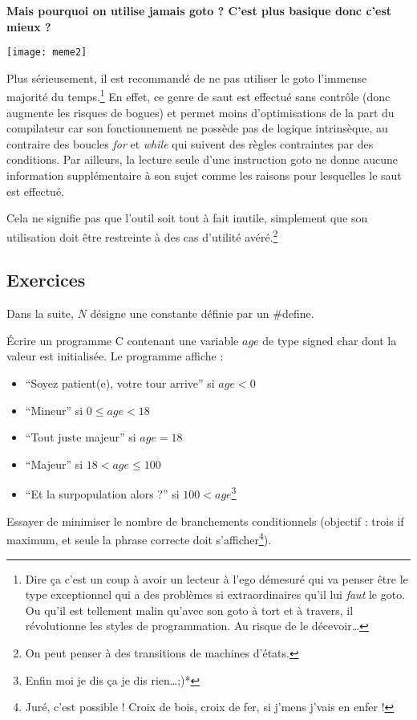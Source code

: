 \documentclass[../../../main.tex]{subfiles}
\begin{document}
\textbf{\color{red}Mais pourquoi on utilise jamais \textsf{goto} ? C'est plus basique donc c'est mieux ?}

\begin{minipage}{\textwidth}
	\begin{center}
		\texttt{[image: meme2]}
	\end{center}
\end{minipage}
 
Plus sérieusement, il est recommandé de ne pas utiliser le \textsf{goto} l'immense majorité du temps.\footnote{Dire ça c'est un coup à avoir un lecteur à l'ego démesuré qui va penser être le type exceptionnel qui a des problèmes si extraordinaires qu'il lui \textit{faut} le \textsf{goto}. Ou qu'il est tellement malin qu'avec son \textsf{goto} à tort et à travers, il révolutionne les styles de programmation. Au risque de le décevoir\dots} En effet, ce genre de saut est effectué sans contrôle (donc augmente les risques de bogues) et permet moins d'optimisations de la part du compilateur car son fonctionnement ne possède pas de logique intrinsèque, au contraire des boucles \textit{for} et \textit{while} qui suivent des règles contraintes par des conditions. Par ailleurs, la lecture seule d'une instruction \textsf{goto} ne donne aucune information supplémentaire à son sujet comme les raisons pour lesquelles le saut est effectué.

Cela ne signifie pas que l'outil soit tout à fait inutile, simplement que son utilisation doit être restreinte à des cas d'utilité avéré.\footnote{On peut penser à des transitions de machines d'états.}

\subsection{Exercices}
Dans la suite, $N$ désigne une constante définie par un \textsf{\#define}.

 Écrire un programme C contenant une variable $age$ de type \textsf{signed char} dont la valeur est initialisée. Le programme affiche :
\begin{itemize}
	\item ``Soyez patient(e), votre tour arrive'' si $age < 0$
	\item ``Mineur'' si $0 \leq age < 18$
	\item ``Tout juste majeur'' si $age = 18$
	\item ``Majeur'' si $18 < age \leq{100}$
	\item ``Et la surpopulation alors ?'' si $100 < age$\footnote{Enfin moi je dis ça je dis rien\dots;)*}
\end{itemize}
Essayer de minimiser le nombre de branchements conditionnels (objectif : trois \textsf{if} maximum, et seule la phrase correcte doit s'afficher\footnote{Juré, c'est possible ! Croix de bois, croix de fer, si j'mens j'vais en enfer !}).
 
\end{document}
